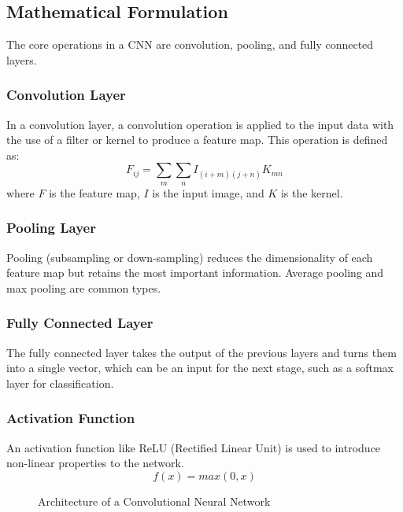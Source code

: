 \documentclass[12pt]{article}
\begin{document}
\subsection{Mathematical Formulation}
The core operations in a CNN are convolution, pooling, and fully connected layers.

\subsubsection{Convolution Layer}
In a convolution layer, a convolution operation is applied to the input data with the use of a filter or kernel to produce a feature map. This operation is defined as:
\begin{equation}
    F_{ij} = \sum_{m}\sum_{n}I_{(i+m)(j+n)}K_{mn}
\end{equation}
where \( F \) is the feature map, \( I \) is the input image, and \( K \) is the kernel.

\subsubsection{Pooling Layer}
Pooling (subsampling or down-sampling) reduces the dimensionality of each feature map but retains the most important information. Average pooling and max pooling are common types.

\subsubsection{Fully Connected Layer}
The fully connected layer takes the output of the previous layers and turns them into a single vector, which can be an input for the next stage, such as a softmax layer for classification.

\subsubsection{Activation Function}
An activation function like ReLU (Rectified Linear Unit) is used to introduce non-linear properties to the network.
\begin{equation}
    f(x) = max(0, x)
\end{equation}

\pagebreak

\begin{figure}[h!]
\centering
{}
\caption{Architecture of a Convolutional Neural Network}
\end{figure}
\end{document}
